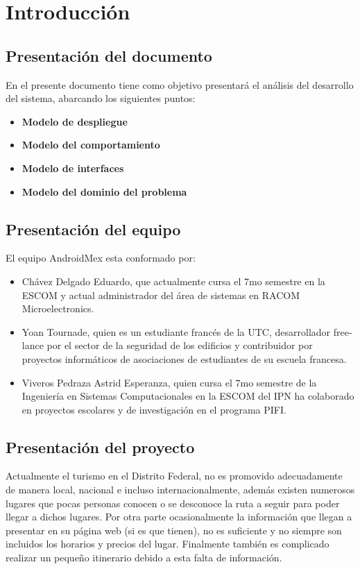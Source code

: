 
\section{Introducci\'on}
\subsection{Presentaci\'on del documento}
En el presente documento tiene como objetivo presentar\'a el an\'alisis del desarrollo del sistema, abarcando los siguientes puntos:
\begin{itemize}
 \item \textbf{Modelo de despliegue}
 \item \textbf{Modelo del comportamiento}
 \item \textbf{Modelo de interfaces}
 \item \textbf{Modelo del dominio del problema} 
\end{itemize}

\subsection{Presentaci\'on del equipo}
 El equipo AndroidMex esta conformado por:
 \begin{itemize}
 	\item Ch\'avez Delgado Eduardo, que actualmente cursa el 7mo semestre en la ESCOM y actual administrador
 del \'area de sistemas en RACOM Microelectronics.
 	\item Yoan Tournade, quien es un estudiante franc\'es de la UTC, desarrollador free-lance por el sector de la seguridad de los edificios y contribuidor por proyectos inform\'aticos de asociaciones de estudiantes de su escuela francesa.
 	\item Viveros Pedraza Astrid Esperanza, quien cursa el 7mo semestre de la Ingenier\'ia en Sistemas Computacionales en la ESCOM del IPN ha colaborado en proyectos escolares y de investigaci\'on 
 en el programa PIFI.
 \end{itemize}
 
\subsection{Presentaci\'on del proyecto}
Actualmente el turismo en el Distrito Federal, no es promovido adecuadamente de manera local, nacional e incluso internacionalmente, 
adem\'as existen numerosos lugares que pocas personas conocen o se desconoce la ruta a seguir para poder llegar a dichos lugares. 
Por otra parte ocasionalmente la informaci\'on que llegan a presentar en su p\'agina web (si es que tienen), no es suficiente y no siempre son 
incluidos los horarios y precios del lugar. Finalmente tambi\'en es complicado realizar un peque\~no itinerario debido a esta falta de informaci\'on. 


